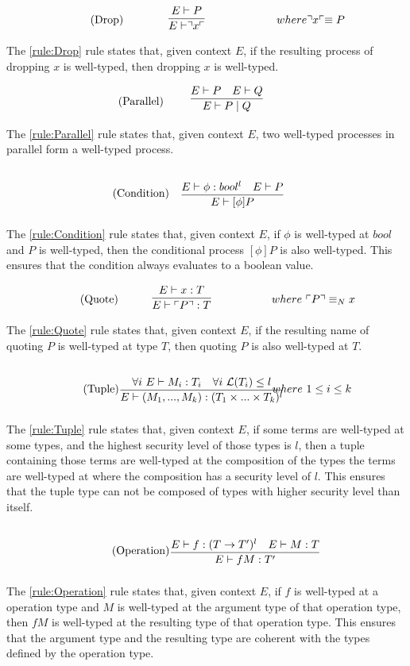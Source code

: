 \begin{align*}
\tag{Drop}\label{rule:Drop} &\infrule{E \vdash P}{E\vdash \drop{x}}& where \drop{x} \equiv P
\end{align*}
The \ref{rule:Drop} rule states that, given context $E$, if the resulting process of dropping $x$ is well-typed, then dropping $x$ is well-typed.

\begin{align*}
\tag{Parallel}\label{rule:Parallel} &\infrule{E\vdash P \quad E \vdash Q}{E \vdash P \para Q}
\end{align*}
The \ref{rule:Parallel} rule states that, given context $E$, two well-typed processes in parallel form a well-typed process.

\begin{align*}
\tag{Condition}\label{rule:Condition} &\infrule{E\vdash \phi:bool^l\quad E\vdash P}{E \vdash [\phi] P}
\end{align*}
The \ref{rule:Condition} rule states that, given context $E$, if $\phi$ is well-typed at $bool$ and $P$ is well-typed, then the conditional process $[\phi]P$ is also well-typed. This ensures that the condition always evaluates to a boolean value.

\begin{align*}
\tag{Quote}\label{rule:Quote} &\infrule{E \vdash x:T}{E\vdash \quot{P}:T}& where\ \quot{P} \equiv_N x
\end{align*}
The \ref{rule:Quote} rule states that, given context $E$, if the resulting name of quoting $P$ is well-typed at type $T$, then quoting $P$ is also well-typed at $T$.

\begin{align*}
\tag{Tuple}\label{rule:Tuple} &\infrule{\forall i\ E\vdash M_i:T_i\quad \forall i\ \level{T_i}\leq l}{E\vdash (M_1,...,M_k):(T_1\times...\times T_k)^l}& where\ 1\leq i\leq k
\end{align*}
The \ref{rule:Tuple} rule states that, given context $E$, if some terms are well-typed at some types, and the highest security level of those types is $l$, then a tuple containing those terms are well-typed at the composition of the types the terms are well-typed at where the composition has a security level of $l$.
This ensures that the tuple type can not be composed of types with higher security level than itself.

\begin{align*}
\tag{Operation}\label{rule:Operation} &\infrule{E\vdash f:(T\ra T')^l\quad E\vdash M:T}{E\vdash fM:T'}
\end{align*}
The \ref{rule:Operation} rule states that, given context $E$, if $f$ is well-typed at a operation type and $M$ is well-typed at the argument type of that operation type, then $fM$ is well-typed at the resulting type of that operation type.
This ensures that the argument type and the resulting type are coherent with the types defined by the operation type.

